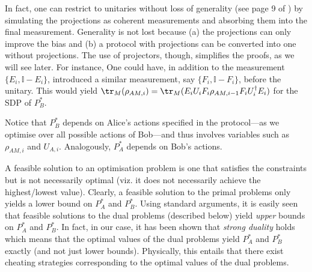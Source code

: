 \documentclass{theoretics}
\begin{document}
\begin{remark}
  In fact, one can restrict to unitaries without loss of generality
  (see page 9 of \cite{Mochon07}) by simulating the projections as
  coherent measurements and absorbing them into the final measurement.
  Generality is not
  lost because (a) the projections can only improve the bias
  and (b) a protocol with projections can be converted into one without projections. The use of projectors, though, simplifies the proofs, as we will see later.
  For instance,
  One could have, in addition to the measurement $\{E_{i},\mathbb{I}-E_{i}\}$,
  introduced a similar measurement, say $\{F_{i},\mathbb{I}-F_{i}\}$,
  before the unitary. This would yield $\tr_{M}(\rho_{AM,i})=\tr_{M}(E_{i}U_{i}F_{i}\rho_{AM,i-1}F_{i}U_{i}^{\dagger}E_{i})$
  for the SDP of $P_{B}^{*}$. %
  \label{rem:projBeforeAndAfter}
\end{remark}


Notice that $P_{B}^{*}$ depends on Alice's actions
specified in the protocol---as we optimise
over all possible actions of Bob---and thus involves variables such
as $\rho_{AM,i}$ and $U_{A,i}$. Analogously, $P_{A}^{*}$ depends
on Bob's actions.

A feasible solution to an optimisation problem is one that satisfies the constraints but is not necessarily optimal (viz. it does not necessarily achieve the highest/lowest value). Clearly, a feasible solution to the primal problems only yields a lower bound on $P_A^*$ and $P_B^*$. Using standard arguments, it is easily seen that feasible solutions to the dual problems (described below) yield \emph{upper} bounds on $P_A^*$ and $P_B^*$. In fact, in our case, it has been shown that \emph{strong duality} holds which means that the optimal values of the dual problems yield $P_A^*$ and $P_B^*$ exactly (and not just lower bounds). Physically, this entails that there exist cheating strategies corresponding to the optimal values of the dual problems.

%
%
%
%
%
%
%
%
%
%
\end{document}
